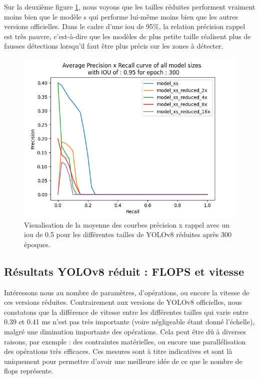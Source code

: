 Sur la deuxième figure \ref{fig:yolov8_visulization_apxr095_reduced_models}, nous voyons que les tailles réduites performent vraiment moins bien que le modèle s qui performe lui-même moins bien que les autres versions officielles. Dans le cadre d'une \acrshort{iou} de 95\%, la relation précision rappel est très pauvre, c'est-à-dire que les modèles de plus petite taille réalisent plus de fausses détections lorsqu'il faut être plus précis sur les zones à détecter.

\begin{figure}[hbt!]
    \centering
    \includegraphics[scale=0.7]{Figures/results/yolov8/apxr_095_300_reduced_models.png}
    \caption{Visualisation de la moyenne des courbes précision x rappel avec un \acrshort{iou} de 0.5 pour les différentes tailles de YOLOv8 réduites après 300 époques.}
    \label{fig:yolov8_visulization_apxr095_reduced_models}
\end{figure}

\break


\subsection{Résultats YOLOv8 réduit : FLOPS et vitesse}

Intéressons nous au nombre de paramètres, d'opérations, ou encore la vitesse de ces versions réduites. Contrairement aux versions de YOLOv8 officielles, nous constatons que la différence de vitesse entre les différentes tailles qui varie entre 0.39 et 0.41 ms n'est pas très importante (voire négligeable étant donné l'échelle), malgré une diminution importante des opérations. Cela peut être dû à diverses raisons, par exemple : des contraintes matérielles, ou encore une parallélisation des opérations très efficaces.
Ces mesures sont à titre indicatives et sont là uniquement pour permettre d'avoir une meilleure idée de ce que le nombre de \acrshort{flops} représente.

